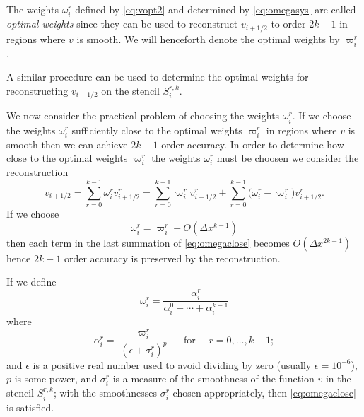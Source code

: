 \documentclass{article}
\newcommand{\for}[0]{\quad \text{ for } \quad}
\newcommand{\xlj}[0]{x_{j-1/2}}
\newcommand{\xrj}[0]{x_{j+1/2}}
\newcommand{\vli}[0]{v_{i-1/2}}
\newcommand{\vri}[0]{v_{i+1/2}}
\numberwithin{equation}{section}
\begin{document}
The weights $\omega_i^r$ defined by \eqref{eq:vopt2} and determined by
\eqref{eq:omegasys} are called \emph{optimal weights} since they can
be used to reconstruct $\vri$ to order $2k-1$ in regions where $v$ is
smooth.  We will henceforth denote the optimal weights by
$\varpi_i^r$.

A similar procedure can be used to determine the optimal weights for
reconstructing $\vli$ on the stencil $S_i^{r,k}$.

We now consider the practical problem of choosing the weights
$\omega_i^r$.  If we choose the weights $\omega_i^r$ sufficiently
close to the optimal weights $\varpi_i^r$ in regions where $v$ is
smooth then we can achieve $2k-1$ order accuracy.  In order to
determine how close to the optimal weights $\varpi_i^r$ the weights
$\omega_i^r$ must be choosen we consider the reconstruction
\begin{equation}
  \label{eq:omegacloseeqn}
  \vri = \sum_{r=0}^{k-1} \omega_i^r \vri^r
    = \sum_{r=0}^{k-1} \varpi_i^r \vri^r
    + \sum_{r=0}^{k-1} \bigl( \omega_i^r - \varpi_i^r \bigr) \vri^r.
\end{equation}
If we choose
\begin{equation}
  \label{eq:omegaclose}
  \omega_i^r = \varpi_i^r + O(\Delta x^{k-1})
\end{equation}
then each term in the last summation of \eqref{eq:omegaclose} becomes
$O(\Delta x^{2k-1})$ hence $2k-1$ order accuracy is preserved by the
reconstruction.

If we define
\begin{equation}
  \label{eq:omega}
  \omega_i^r = \frac{\alpha_i^r}{\alpha_i^0 + \cdots + \alpha_i^{k-1}}
\end{equation}
where
\begin{equation}
  \label{eq:alpha}
  \alpha_i^r = \frac{\varpi_i^r}{(\epsilon + \sigma_i^r)^p} \for r = 0, \ldots, k-1;
\end{equation}
and $\epsilon$ is a positive real number used to avoid dividing by
zero (usually $\epsilon = 10^{-6}$), $p$ is some power, and
$\sigma_i^r$ is a measure of the smoothness of the function $v$ in the
stencil $S^{r,k}_i$; with the smoothnesses $\sigma_i^r$ chosen
appropriately, then \eqref{eq:omegaclose} is satisfied.

\end{document}

